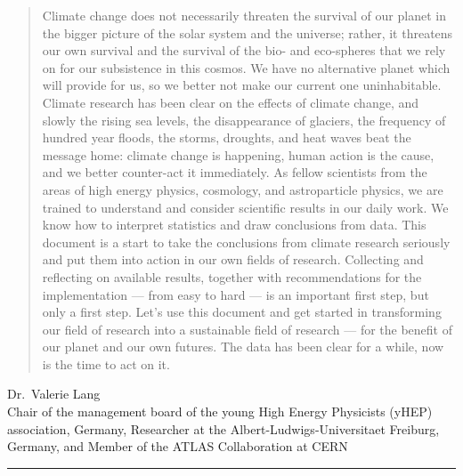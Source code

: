 \documentclass[../SustainableHEP.tex]{subfiles}
\begin{document}
\begin{quotation}
Climate change does not necessarily threaten the survival of our planet in the bigger picture of the solar system and the universe; rather, it threatens our own survival and the survival of the bio- and eco-spheres that we rely on for our subsistence in this cosmos. We have no alternative planet which will provide for us, so we better not make our current one uninhabitable.
Climate research has been clear on the effects of climate change, and slowly the rising sea levels, the disappearance of glaciers, the frequency of hundred year floods, the storms, droughts, and heat waves beat the message home: climate change is happening, human action is the cause, and we better counter-act it immediately.
As fellow scientists from the areas of high energy physics, cosmology, and astroparticle physics, we are trained to understand and consider scientific results in our daily work. We know how to interpret statistics and draw conclusions from data. 
This document is a start to take the conclusions from climate research seriously and put them into action in our own fields of research. Collecting and reflecting on available results, together with recommendations for the implementation --- from easy to hard --- is an important first step, but only a first step. Let's use this document and get started in transforming our field of research into a sustainable field of research --- for the benefit of our planet and our own futures. The data has been clear for a while, now is the time to act on it.
\end{quotation}
\begin{flushleft}
Dr.~Valerie Lang \\
Chair of the management board of the young High Energy Physicists (yHEP) association, Germany,
Researcher at the Albert-Ludwigs-Universitaet Freiburg, Germany, and
Member of the ATLAS Collaboration at CERN
\end{flushleft}

\textcolor{Pythongreen}{\rule{2cm}{3pt}}
\end{document}
